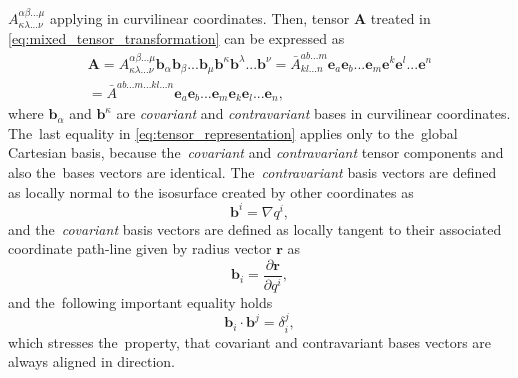 \documentclass[preprint,12pt]{elsarticle}
\newcommand{\pdv}[2]{\frac{\partial{#1}}{\partial{#2}}}
\newcommand{\vect}[1]{\boldsymbol{#1}}
\newcommand{\matr}[1]{\mathbf{#1}}
\newcounter{bla}
\begin{document}
$A^{\alpha\beta...\mu}_{\kappa\lambda...\nu}$ applying in curvilinear 
coordinates. 
Then, tensor $\matr{A}$ treated in \eqref{eq:mixed_tensor_transformation} 
can be expressed as
\begin{multline}
  \matr{A} = A^{\alpha\beta...\mu}_{\kappa\lambda...\nu} 
  \vect{b}_\alpha\vect{b}_\beta...\vect{b}_\mu
  \vect{b}^{\kappa}\vect{b}^{\lambda}...\vect{b}^{\nu}
  = \bar{A}^{ab...m}_{kl...n}\vect{e}_a\vect{e}_b...\vect{e}_m
  \vect{e}^{k}\vect{e}^{l}...\vect{e}^{n}\\ 
  = \bar{A}^{ab...m...kl...n}\vect{e}_a\vect{e}_b...\vect{e}_m
  \vect{e}_{k}\vect{e}_{l}...\vect{e}_{n}, 
  \label{eq:tensor_representation}
\end{multline}
where $\vect{b}_\alpha$ and $\vect{b}^{\kappa}$ are 
\textit{covariant} and \textit{contravariant} bases in curvilinear coordinates. 
The~last equality in \eqref{eq:tensor_representation} applies only to 
the~global Cartesian basis, because the~\textit{covariant} and 
\textit{contravariant} tensor components and also
the~bases vectors are identical. 
The~\textit{contravariant} basis vectors 
are defined as locally normal to the isosurface created by other coordinates as
\begin{equation}
  \vect{b}^i = \nabla q^i ,
  \label{eq:contravariant_bases}
\end{equation}
and the~\textit{covariant} basis vectors are defined as locally tangent to 
their associated coordinate path-line given by radius vector $\vect{r}$ as
\begin{equation}
  \vect{b}_i = \pdv{\vect{r}}{q^i} ,
  \label{eq:covariant_bases}
\end{equation}
and the~following important equality holds
\begin{equation}
  \vect{b}_i\cdot\vect{b}^j = \delta_i^j ,
  \label{eq:basis_vectors_alignement}
\end{equation}
which stresses the~property, that covariant and contravariant bases vectors
are always aligned in direction.
\end{document}
